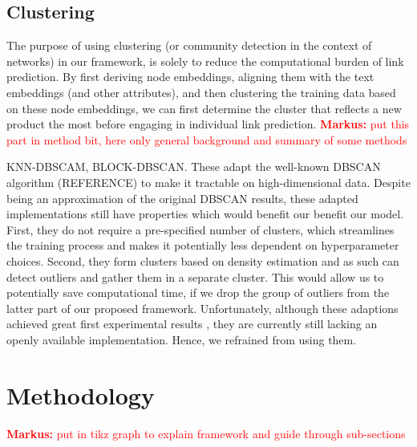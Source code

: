 \documentclass[a4paper]{article} %
\newcommand{\MM}[1]{\textcolor{red}{\textbf{Markus:} #1}}
\begin{document}
\citet{ni2019}

\citet{xia2021}

\citet{zhou2020}

\subsection{Clustering}

The purpose of using clustering (or community detection in the context of networks) in our framework, is solely to reduce the computational burden of link prediction. By first deriving node embeddings, aligning them with the text embeddings (and other attributes), and then clustering the training data based on these node embeddings, we can first determine the cluster that reflects a new product the most before engaging in individual link prediction. \MM{put this part in method bit, here only general background and summary of some methods}

\citet{su2021}

\citet{liu2020a}

\citet{hao2020}

\citet{xu2021}

\citet{zhang2021}




\citet{chen2020} KNN-DBSCAM, \citet{chen2021b} BLOCK-DBSCAN. These adapt the well-known DBSCAN algorithm (REFERENCE) to make it tractable on high-dimensional data. Despite being an approximation of the original DBSCAN results, these adapted implementations still have properties which would benefit our benefit our model. First, they do not require a pre-specified number of clusters, which streamlines the training process and makes it potentially less dependent on hyperparameter choices. Second, they form clusters based on density estimation and as such can detect outliers and gather them in a separate cluster. This would allow us to potentially save computational time, if we drop the group of outliers from the latter part of our proposed framework. Unfortunately, although these adaptions achieved great first experimental results \citep{chen2020, chen2021b}, they are currently  still lacking an openly available implementation. Hence, we refrained from using them.

\section{Methodology}

\MM{put in tikz graph to explain framework and guide through sub-sections}
\end{document}
